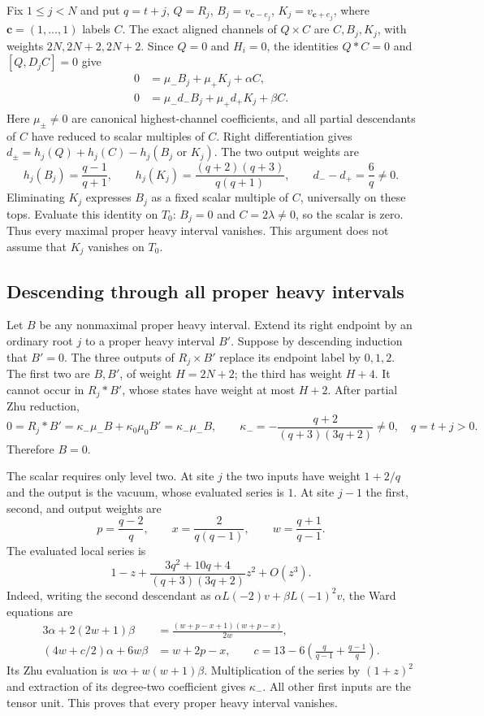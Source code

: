 \documentclass[11pt,a4paper]{article}
\numberwithin{equation}{section}
\theoremstyle{definition}\newtheorem{definition}[theorem]{Definition}
\theoremstyle{remark}\newtheorem{remark}[theorem]{Remark}
\begin{document}
Fix $1\leq j<N$ and put $q=t+j$, $Q=R_j$,
$B_j=v_{\mathbf c-e_j}$, $K_j=v_{\mathbf c+e_j}$, where
$\mathbf c=(1,\ldots,1)$ labels $C$.  The exact aligned channels of
$Q\times C$ are $C,B_j,K_j$, with weights $2N,2N+2,2N+2$.
Since $Q=0$ and $H_i=0$, the identities $Q*C=0$ and $[Q,D_jC]=0$
give
\begin{align*}
 0&=\mu_-B_j+\mu_+K_j+\alpha C,\\
 0&=\mu_-d_-B_j+\mu_+d_+K_j+\beta C.
\end{align*}
Here $\mu_\pm\ne0$ are canonical highest-channel coefficients, and all
partial descendants of $C$ have reduced to scalar multiples of $C$.
Right differentiation gives
$d_\pm=h_j(Q)+h_j(C)-h_j(B_j\text{ or }K_j)$.  The two output weights are
\[
 h_j(B_j)=\frac{q-1}{q+1},\qquad
 h_j(K_j)=\frac{(q+2)(q+3)}{q(q+1)},
 \qquad d_--d_+=\frac6q\ne0.
\]
Eliminating $K_j$ expresses $B_j$ as a fixed scalar multiple of $C$,
universally on these tops.  Evaluate this identity on $T_0$:
$B_j=0$ and $C=2\lambda\ne0$, so the scalar is zero.  Thus every maximal
proper heavy interval vanishes.  This argument does not assume that
$K_j$ vanishes on $T_0$.

\subsection{Descending through all proper heavy intervals}

Let $B$ be any nonmaximal proper heavy interval.  Extend its right endpoint
by an ordinary root $j$ to a proper heavy interval $B'$.  Suppose by
descending induction that $B'=0$.  The three outputs of $R_j\times B'$
replace its endpoint label by $0,1,2$.  The first two are $B,B'$, of
weight $H=2N+2$; the third has weight $H+4$.  It cannot occur in
$R_j*B'$, whose states have weight at most $H+2$.  After partial Zhu
reduction,
\[
 0=R_j*B'=\kappa_-\mu_-B+\kappa_0\mu_0B'
            =\kappa_-\mu_-B,
 \qquad
 \kappa_-=-\frac{q+2}{(q+3)(3q+2)}\ne0,
 \quad q=t+j>0.
\]
Therefore $B=0$.

The scalar requires only level two.  At site $j$ the two inputs have
weight $1+2/q$ and the output is the vacuum, whose evaluated series is
$1$.  At site $j-1$ the first, second, and output weights are
\[
 p=\frac{q-2}{q},\qquad x=\frac2{q(q-1)},\qquad
 w=\frac{q+1}{q-1}.
\]
The evaluated local series is
\[
 1-z+\frac{3q^2+10q+4}{(q+3)(3q+2)}z^2+O(z^3).
\]
Indeed, writing the second descendant as
$\alpha L(-2)v+\beta L(-1)^2v$, the Ward equations are
\begin{align*}
 3\alpha+2(2w+1)\beta
    &=\frac{(w+p-x+1)(w+p-x)}{2w},\\
 (4w+c/2)\alpha+6w\beta&=w+2p-x,
 \qquad c=13-6\left(\frac q{q-1}+\frac{q-1}q\right).
\end{align*}
Its Zhu evaluation is $w\alpha+w(w+1)\beta$.
Multiplication of the series by $(1+z)^2$ and extraction of its degree-two
coefficient gives $\kappa_-$.  All other first inputs are the tensor unit.
This proves that every proper heavy interval vanishes.
\end{document}
